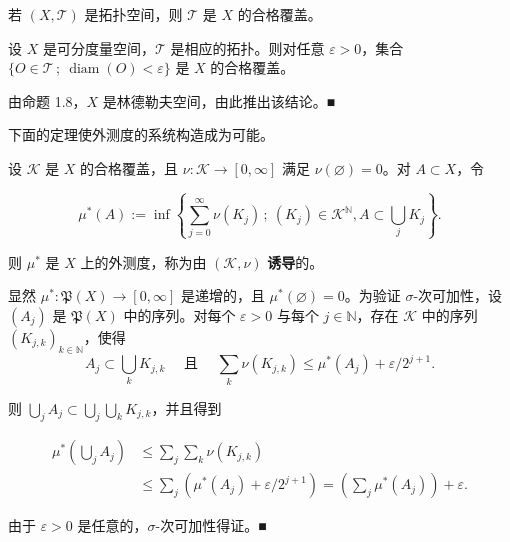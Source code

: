 \begin{remark}
\begin{items}
若 $ (X, \mathcal{T}) $ 是拓扑空间，则 $ \mathcal{T} $ 是 $ X $ 的合格覆盖。

\item

设 $ X $ 是可分度量空间，$ \mathcal{T} $ 是相应的拓扑。则对任意 $ \varepsilon > 0 $，集合 $ \{ O \in \mathcal{T} \,;\ \operatorname{diam}(O) < \varepsilon \} $ 是 $ X $ 的合格覆盖。

\proofhead
由命题 1.8，$ X $ 是林德勒夫空间，由此推出该结论。\nobreak\hspace{0.35em}■
\end{items}

下面的定理使外测度的系统构造成为可能。

\end{remark}

\begin{theorem}

设 $ \mathcal{K} $ 是 $ X $ 的合格覆盖，且 $ \nu\colon \mathcal{K} \to [0,\infty] $ 满足 $ \nu(\varnothing) = 0 $。对 $ A \subset X $，令

\[
\mu^*(A) := \inf\left\{ \sum_{j=0}^{\infty} \nu(K_j) \,;\ (K_j) \in \mathcal{K}^{\mathbb{N}} , A \subset \bigcup_j K_j \right\} .
\]

则 $ \mu^* $ 是 $ X $ 上的外测度，称为由 $ (\mathcal{K}, \nu) $ \textbf{诱导}的。

\proofhead
显然 $ \mu^*\colon \mathfrak{P}(X) \to [0,\infty] $ 是递增的，且 $ \mu^*(\varnothing) = 0 $。为验证 $ \sigma $-次可加性，设 $ (A_j) $ 是 $ \mathfrak{P}(X) $ 中的序列。对每个 $ \varepsilon > 0 $ 与每个 $ j \in \mathbb{N} $，存在 $ \mathcal{K} $ 中的序列 $ (K_{j,k})_{k \in \mathbb{N}} $，使得
\[
A_j \subset \bigcup_k K_{j,k} \quad \text{ 且 } \quad \sum_k \nu(K_{j,k}) \le \mu^*(A_j) + \varepsilon/2^{j+1} .
\]

则 $ \bigcup_j A_j \subset \bigcup_j \bigcup_k K_{j,k} $，并且得到

\begin{equation*}
\begin{aligned}
\mu^*\left(\bigcup_j A_j\right) &\le \sum_j \sum_k \nu(K_{j,k}) \\ &\le \sum_j \left( \mu^*(A_j) + \varepsilon/2^{j+1} \right) = \left( \sum_j \mu^*(A_j) \right) + \varepsilon .
\end{aligned}
\end{equation*}

由于 $ \varepsilon > 0 $ 是任意的，$ \sigma $-次可加性得证。\nobreak\hspace{0.35em}■

\end{theorem}

